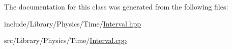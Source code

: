 The documentation for this class was generated from the following files\+:\begin{DoxyCompactItemize}
\item 
include/\+Library/\+Physics/\+Time/\hyperlink{_interval_8hpp}{Interval.\+hpp}\item 
src/\+Library/\+Physics/\+Time/\hyperlink{_interval_8cpp}{Interval.\+cpp}\end{DoxyCompactItemize}
